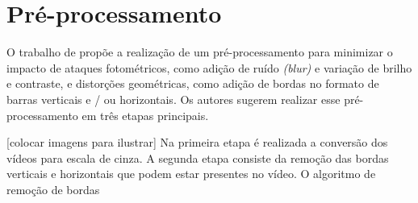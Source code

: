 \section{Pré-processamento}
\label{sec:preprocessamento}


O trabalho de \citeauthor{Dutta2013} propõe a realização de um pré-processamento para minimizar o impacto de ataques fotométricos, como adição de ruído \textit{(blur)} e variação de brilho e contraste, e distorções geométricas, como adição de bordas no formato de barras verticais e / ou horizontais. Os autores sugerem realizar esse pré-processamento em três etapas principais.

[colocar imagens para ilustrar]
Na primeira etapa é realizada a conversão dos vídeos para escala de cinza. A segunda etapa consiste da remoção das bordas verticais e horizontais que podem estar presentes no vídeo. O algoritmo de remoção de bordas 